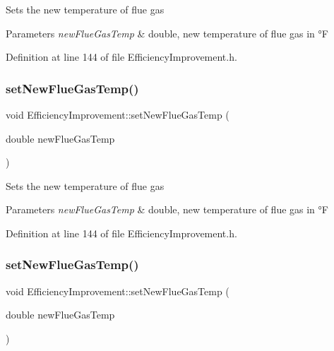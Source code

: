 Sets the new temperature of flue gas


\begin{DoxyParams}{Parameters}
{\em new\+Flue\+Gas\+Temp} & double, new temperature of flue gas in °F \\
\hline
\end{DoxyParams}


Definition at line 144 of file Efficiency\+Improvement.\+h.

\mbox{\label{class_efficiency_improvement_ab88d3976fca8f55bb1fd3278bc427fc1}} 
\subsubsection{\texorpdfstring{set\+New\+Flue\+Gas\+Temp()}{setNewFlueGasTemp()}\hspace{0.1cm}{\footnotesize\ttfamily [2/3]}}
{\footnotesize\ttfamily void Efficiency\+Improvement\+::set\+New\+Flue\+Gas\+Temp (\begin{DoxyParamCaption}\item[{double}]{new\+Flue\+Gas\+Temp }\end{DoxyParamCaption})\hspace{0.3cm}{\ttfamily [inline]}}

Sets the new temperature of flue gas


\begin{DoxyParams}{Parameters}
{\em new\+Flue\+Gas\+Temp} & double, new temperature of flue gas in °F \\
\hline
\end{DoxyParams}


Definition at line 144 of file Efficiency\+Improvement.\+h.

\mbox{\label{class_efficiency_improvement_ab88d3976fca8f55bb1fd3278bc427fc1}} 
\subsubsection{\texorpdfstring{set\+New\+Flue\+Gas\+Temp()}{setNewFlueGasTemp()}\hspace{0.1cm}{\footnotesize\ttfamily [3/3]}}
{\footnotesize\ttfamily void Efficiency\+Improvement\+::set\+New\+Flue\+Gas\+Temp (\begin{DoxyParamCaption}\item[{double}]{new\+Flue\+Gas\+Temp }\end{DoxyParamCaption})\hspace{0.3cm}{\ttfamily [inline]}}

